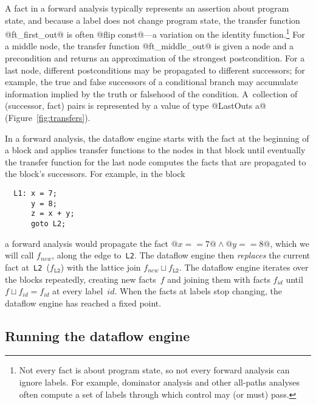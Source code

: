 \documentclass[blockstyle,preprint,natbib,nocopyrightspace]{sigplanconf}
\newcommand\join{\sqcup}
\def\authornote#1{\unskip\relax}
\newcommand{\norman}[1]{\authornote{NR: #1}}
\let\remark\norman
\newcommand\figref[1]{Figure~\ref{fig:#1}}
\begin{document}
A fact in a forward analysis typically represents an assertion
about program state,
 and because a label does not change
program state, the transfer function @ft_first_out@ is often
@flip const@---a variation on
the
identity function.\footnote
{Not every fact is about program state,
so not every forward analysis can ignore labels.
For example, dominator analysis and other all-paths analyses often
compute a set of labels through which control may (or must) pass.
}
For a middle node, the transfer function @ft_middle_out@ is given a
node and a precondition and returns an approximation of the strongest
postcondition. 
For a last node, different postconditions may be propagated to
different successors; for example, the true and false successors of a
conditional branch may accumulate information implied by the truth or
falsehood of the condition.
A~collection of (successor, fact) pairs is represented by a value of
type @LastOuts a@ (\figref{transfers}).




In a forward analysis, the dataflow engine starts with the fact at the
beginning of a block and applies transfer functions to the nodes in
that block until eventually the transfer function for the last node
computes the facts that are propagated to the block's successors.
For example, in the block
\begin{verbatim}
  L1: x = 7;
      y = 8;
      z = x + y;
      goto L2;
\end{verbatim}
a forward analysis would propagate the fact 
$@x == 7@ \land @y == 8@$, which we will call $f_{\mathit{new}}$,
along the edge to~\texttt{L2}. 
The dataflow engine then \emph{replaces} the current fact
at~\texttt{L2}~($f_{\mathtt{L2}}$) with the lattice join $f_{\mathit{new}}
\join f_{\mathtt{L2}}$. 
The dataflow engine iterates over the blocks repeatedly, creating new
facts~$f$ and joining them with facts $f_{\mathit{id}}$ until
\mbox{$f \join f_{\mathit{id}} = f_{\mathit{id}}$} at every label~$\mathit{id}$.
When the facts at labels stop changing, the dataflow
engine has reached a fixed point.


\ifpagetuning\enlargethispage{0.5\baselineskip}\fi


\subsection{Running the dataflow engine}
\end{document}

